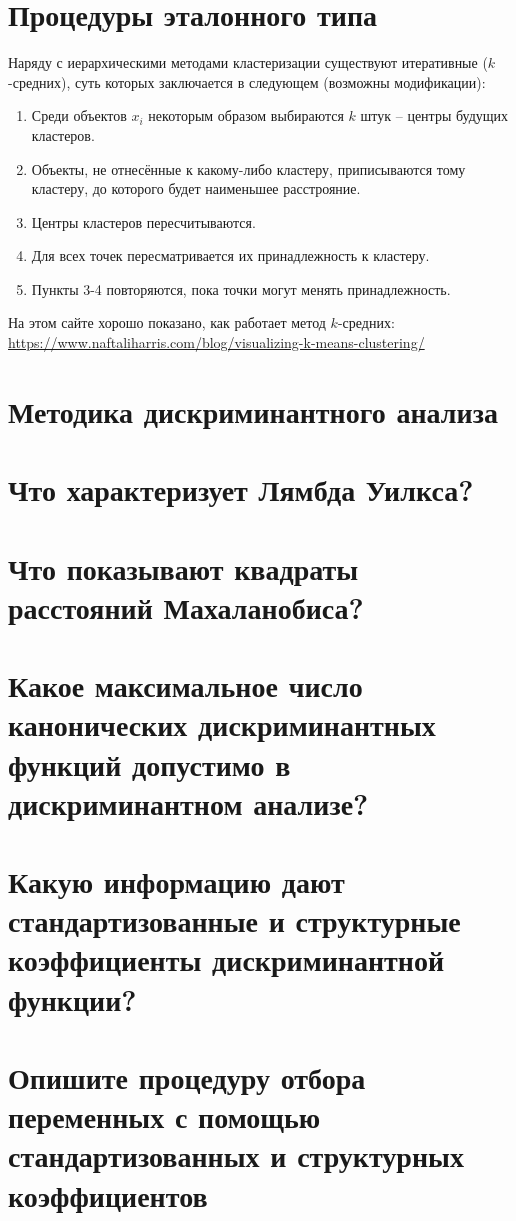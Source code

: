 \documentclass[a4paper, 12pt]{article}
\begin{document}
\section{Процедуры эталонного типа}
Наряду с иерархическими методами кластеризации существуют итеративные ($k$-средних), суть которых заключается в следующем (возможны модификации):
\begin{enumerate}
    \item Среди объектов $x_i$ некоторым образом выбираются $k$ штук -- центры будущих кластеров.
    \item Объекты, не отнесённые к какому-либо кластеру, приписываются тому кластеру, до которого будет наименьшее расстрояние.
    \item Центры кластеров пересчитываются.
    \item Для всех точек пересматривается их принадлежность к кластеру.
    \item Пункты 3-4 повторяются, пока точки могут менять принадлежность.
\end{enumerate}
На этом сайте хорошо показано, как работает метод $k$-средних: \url{https://www.naftaliharris.com/blog/visualizing-k-means-clustering/}

\section{Методика дискриминантного анализа}
\section{Что характеризует Лямбда Уилкса?}
\section{Что показывают квадраты расстояний Махаланобиса?}
\section{Какое максимальное число канонических дискриминантных функций допустимо в дискриминантном анализе?}
\section{Какую информацию дают стандартизованные и структурные коэффициенты дискриминантной функции?}
\section{Опишите процедуру отбора переменных с помощью стандартизованных и структурных коэффициентов}
\end{document}
